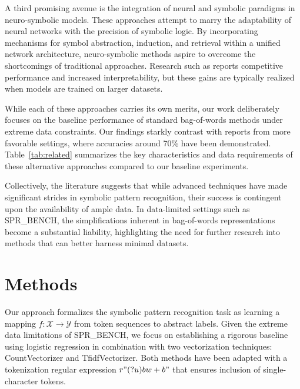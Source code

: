 \documentclass{article}
\begin{document}
A third promising avenue is the integration of neural and symbolic paradigms in neuro-symbolic models. These approaches attempt to marry the adaptability of neural networks with the precision of symbolic logic. By incorporating mechanisms for symbol abstraction, induction, and retrieval within a unified network architecture, neuro-symbolic methods aspire to overcome the shortcomings of traditional approaches. Research such as \cite{neuro_symbolic} reports competitive performance and increased interpretability, but these gains are typically realized when models are trained on larger datasets.

While each of these approaches carries its own merits, our work deliberately focuses on the baseline performance of standard bag-of-words methods under extreme data constraints. Our findings starkly contrast with reports from more favorable settings, where accuracies around 70\% have been demonstrated. Table~\ref{tab:related} summarizes the key characteristics and data requirements of these alternative approaches compared to our baseline experiments.

Collectively, the literature suggests that while advanced techniques have made significant strides in symbolic pattern recognition, their success is contingent upon the availability of ample data. In data-limited settings such as SPR\_BENCH, the simplifications inherent in bag-of-words representations become a substantial liability, highlighting the need for further research into methods that can better harness minimal datasets.

\section{Methods}
Our approach formalizes the symbolic pattern recognition task as learning a mapping \( f: \mathcal{X} \to \mathcal{Y} \) from token sequences to abstract labels. Given the extreme data limitations of SPR\_BENCH, we focus on establishing a rigorous baseline using logistic regression in combination with two vectorization techniques: CountVectorizer and TfidfVectorizer. Both methods have been adapted with a tokenization regular expression \( r"(?u)\\b\\w+\\b" \) that ensures inclusion of single-character tokens.
\end{document}
